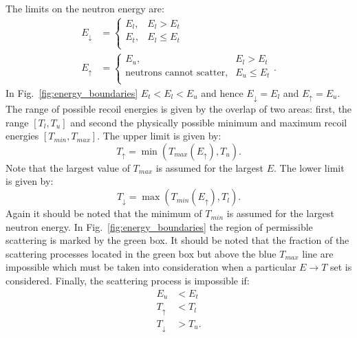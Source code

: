 \documentclass[review]{elsarticle}
\begin{document}
The limits on the neutron energy are:
\begin{align}
 E_{\downarrow} & = \left\{ \begin{array}{ll}
         E_l, & E_l > E_t \\
         E_t, & E_l \le E_t  \\
         \end{array}
         \right .     \nonumber \\
E_{\uparrow} & = \left\{ \begin{array}{ll}
         E_u, & E_l > E_t \\
         \text{neutrons cannot scatter}, & E_u \le E_t  \\
         \end{array}
         \right .      .   
\end{align} 
In Fig.~\ref{fig:energy_boundaries} $E_t< E_l < E_u$ and hence $E_{\downarrow}=E_l$ and $E_{\uparrow} = E_u$. 
The range of possible recoil energies is given by the overlap of two areas: first, the range $[T_l, T_u]$ and second the physically possible minimum and maximum recoil energies $[T_{min}, T_{max}]$. The upper limit is given by:
\begin{equation}
   T_{\uparrow} = \min \left( T_{max}(E_{\uparrow}), T_u \right).
\end{equation}
Note that the largest value of $T_{max}$ is assumed for the largest $E$. The lower limit is given by:
\begin{equation}
   T_{\downarrow} = \max \left( T_{min}(E_{\uparrow}), T_l \right).
\end{equation}
Again it should be noted that the minimum of $T_{min}$ is assumed for the largest neutron energy. 
In Fig.~\ref{fig:energy_boundaries} the region of permissible scattering is marked by the green box.
It should be noted that the fraction of the scattering processes located in the green box but above the blue $T_{max}$ line are impossible which must be taken into consideration when a particular $E \rightarrow T$ set is considered.
Finally, the scattering process is impossible if:
\begin{align}
   E_u & < E_t \nonumber \\
   T_{\uparrow} & < T_l \nonumber \\
   T_{\downarrow} & > T_u. 
\end{align}
\end{document}
